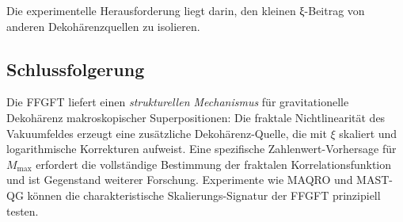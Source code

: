 	Die experimentelle Herausforderung liegt darin, den kleinen ξ-Beitrag von anderen Dekohärenzquellen zu isolieren.
	
	\subsection*{Schlussfolgerung}
	
	Die FFGFT liefert einen \emph{strukturellen Mechanismus} für gravitationelle Dekohärenz makroskopischer Superpositionen: Die fraktale Nichtlinearität des Vakuumfeldes erzeugt eine zusätzliche Dekohärenz-Quelle, die mit \(\xi\) skaliert und logarithmische Korrekturen aufweist. Eine spezifische Zahlenwert-Vorhersage für \(M_{\max}\) erfordert die vollständige Bestimmung der fraktalen Korrelationsfunktion und ist Gegenstand weiterer Forschung. Experimente wie MAQRO und MAST-QG können die charakteristische Skalierungs-Signatur der FFGFT prinzipiell testen.



